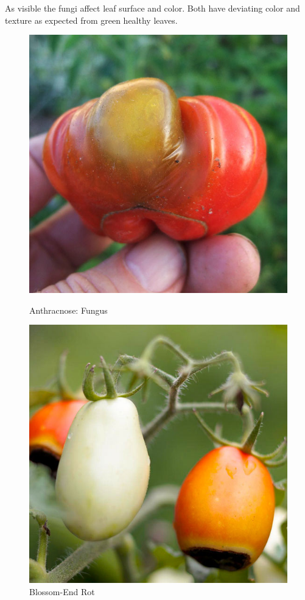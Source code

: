 As visible the fungi affect leaf surface and color. Both have deviating color and texture
as expected from green healthy leaves.

\begin{figure}[H]
    \centering
    \begin{minipage}[b]{0.45\textwidth}
        \includegraphics[width=\textwidth]{user-view/sick_2.jpg}
        \caption{Anthracnose: Fungus}
        \label{fig:Anthracnose}
    \end{minipage}
    \hfill
    \begin{minipage}[b]{0.45\textwidth}
        \includegraphics[width=\textwidth]{user-view/sick_3.jpg}
        \caption{Blossom-End Rot}
        \label{fig:blossom}
    \end{minipage}
\end{figure}

